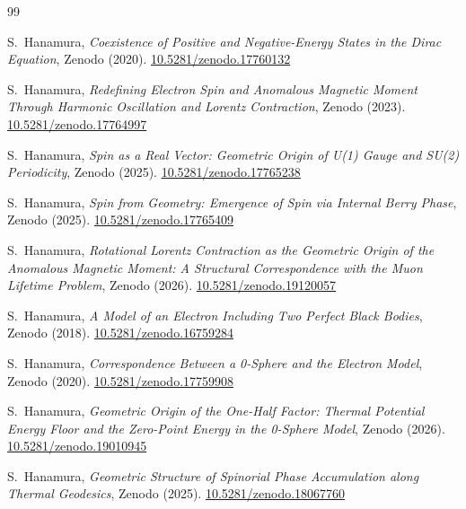 \documentclass[%
 reprint, amsmath,amssymb, aps, prb, ]{revtex4-2}
\numberwithin{equation}{section}
\begin{document}
\begin{thebibliography}{99}


S.~Hanamura, \textit{Coexistence of Positive and Negative-Energy States in the Dirac Equation}, Zenodo (2020). \href{https://doi.org/10.5281/zenodo.17760132}{10.5281/zenodo.17760132}

S.~Hanamura, \textit{Redefining Electron Spin and Anomalous Magnetic Moment Through Harmonic Oscillation and Lorentz Contraction}, Zenodo (2023). \href{https://doi.org/10.5281/zenodo.17764997}{10.5281/zenodo.17764997}

S.~Hanamura, \textit{Spin as a Real Vector: Geometric Origin of U(1) Gauge and SU(2) Periodicity}, Zenodo (2025). \href{https://doi.org/10.5281/zenodo.17765238}{10.5281/zenodo.17765238}

S.~Hanamura, \textit{Spin from Geometry: Emergence of Spin via Internal Berry Phase}, Zenodo (2025). \href{https://doi.org/10.5281/zenodo.17765409}{10.5281/zenodo.17765409}

S.~Hanamura, \textit{Rotational Lorentz Contraction as the Geometric Origin of the Anomalous Magnetic Moment: A Structural Correspondence with the Muon Lifetime Problem}, Zenodo (2026). \href{https://doi.org/10.5281/zenodo.19120057}{10.5281/zenodo.19120057}

S.~Hanamura, \textit{A Model of an Electron Including Two Perfect Black Bodies}, Zenodo (2018). \href{https://doi.org/10.5281/zenodo.16759284}{10.5281/zenodo.16759284}

S.~Hanamura, \textit{Correspondence Between a 0-Sphere and the Electron Model}, Zenodo (2020). \href{https://doi.org/10.5281/zenodo.17759908}{10.5281/zenodo.17759908}

S.~Hanamura, \textit{Geometric Origin of the One-Half Factor: Thermal Potential Energy Floor and the Zero-Point Energy in the 0-Sphere Model}, Zenodo (2026). \href{https://doi.org/10.5281/zenodo.19010945}{10.5281/zenodo.19010945}

S.~Hanamura, \textit{Geometric Structure of Spinorial Phase Accumulation along Thermal Geodesics}, Zenodo (2025). \href{https://doi.org/10.5281/zenodo.18067760}{10.5281/zenodo.18067760}


\end{thebibliography}
\end{document}
